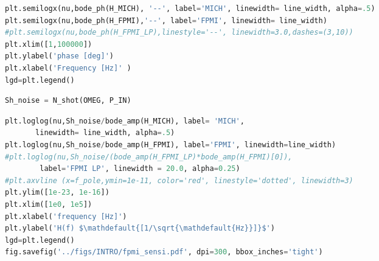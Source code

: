\begin{spacing}{1.2} \begin{lstlisting}[frame=single, language=Python]
plt.semilogx(nu,bode_ph(H_MICH), '--', label='MICH', linewidth= line_width, alpha=.5)
plt.semilogx(nu,bode_ph(H_FPMI),'--', label='FPMI', linewidth= line_width)
#plt.semilogx(nu,bode_ph(H_FPMI_LP),linestyle='--', linewidth=3.0,dashes=(3,10))
plt.xlim([1,100000])
plt.ylabel('phase [deg]')
plt.xlabel('Frequency [Hz]' )
lgd=plt.legend()
\end{lstlisting} \end{spacing}

\begin{spacing}{1.2} \begin{lstlisting}[frame=single, language=Python]
Sh_noise = N_shot(OMEG, P_IN)
\end{lstlisting} \end{spacing}

\begin{spacing}{1.2} \begin{lstlisting}[frame=single, language=Python]
plt.loglog(nu,Sh_noise/bode_amp(H_MICH), label= 'MICH', 
	   linewidth= line_width, alpha=.5)
plt.loglog(nu,Sh_noise/bode_amp(H_FPMI), label='FPMI', linewidth=line_width)
#plt.loglog(nu,Sh_noise/(bode_amp(H_FPMI_LP)*bode_amp(H_FPMI)[0]), 
	    label='FPMI LP', linewidth = 20.0, alpha=0.25)
#plt.axvline (x=f_pole,ymin=1e-11, color='red', linestyle='dotted', linewidth=3)
plt.ylim([1e-23, 1e-16])
plt.xlim([1e0, 1e5])
plt.xlabel('frequency [Hz]')
plt.ylabel('H(f) $\mathdefault{[1/\sqrt{\mathdefault{Hz}}]}$')
lgd=plt.legend()
fig.savefig('../figs/INTRO/fpmi_sensi.pdf', dpi=300, bbox_inches='tight')
\end{lstlisting} \end{spacing}

